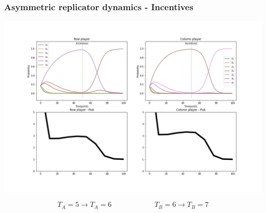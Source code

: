 \begin{frame}
    \frametitle{Asymmetric replicator dynamics - Incentives}
    \centering

    \includegraphics[width=\textwidth, trim = 90 367 90 70, clip]{Bin/replicator_dynamics/ARD_penalty_game.png}

    \[ T_A = 5  \rightarrow T_A = 6 \qquad \qquad \qquad T_B = 6 \rightarrow T_B = 7\]


    

\end{frame}

